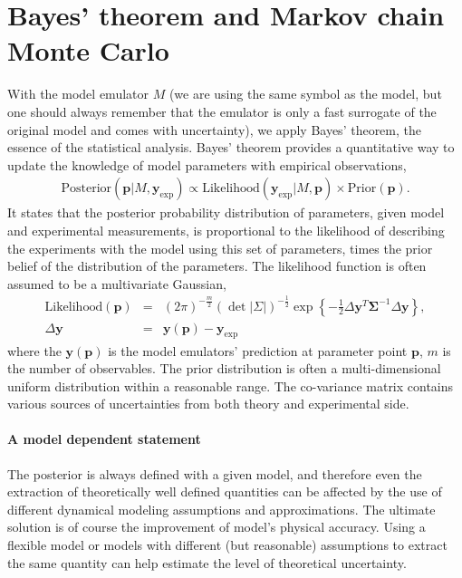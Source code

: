 \section{Bayes' theorem and Markov chain Monte Carlo}
With the model emulator $M$ (we are using the same symbol as the model, but one should always remember that the emulator is only a fast surrogate of the original model and comes with uncertainty), we apply Bayes' theorem, the essence of the statistical analysis.
Bayes' theorem provides a quantitative way to update the knowledge of model parameters with empirical observations,
\begin{eqnarray}
\mathrm{Posterior}(\mathbf{p}|M, \mathbf{y}_{\textrm{exp}}) \propto \mathrm{Likelihood}(\mathbf{y}_{\textrm{exp}}|M, \mathbf{p})\times\mathrm{Prior}(\mathbf{p}).
\end{eqnarray}
It states that the posterior probability distribution of parameters, given model and experimental measurements, is proportional to the likelihood of describing the experiments with the model using this set of parameters, times the prior belief of the distribution of the parameters.
The likelihood function is often assumed to be a multivariate Gaussian,
\begin{eqnarray}
\mathrm{Likelihood}(\mathbf{p}) &=& (2\pi)^{-\frac{m}{2}} (\det|\Sigma|)^{-\frac{1}{2}} \exp\left\{-\frac{1}{2}\Delta \mathbf{y}^T \mathbf{\Sigma}^{-1} \Delta \mathbf{y}\right\}, \\ 
\Delta \mathbf{y} &=& \mathbf{y}(\mathbf{p}) - \mathbf{y}_{\textrm{exp}}
\end{eqnarray}
where the $\mathbf{y}(\mathbf{p})$ is the model emulators' prediction at parameter point $\mathbf{p}$, $m$ is the number of observables.
The prior distribution is often a multi-dimensional uniform distribution within a reasonable range. 
The co-variance matrix contains various sources of uncertainties from both theory and experimental side.

\paragraph{A model dependent statement} The posterior is always defined with a given model, and therefore even the extraction of theoretically well defined quantities can be affected by the use of different dynamical modeling assumptions and approximations.
The ultimate solution is of course the improvement of model's physical accuracy.
Using a flexible model or models with different (but reasonable) assumptions to extract the same quantity can help estimate the level of theoretical uncertainty.

